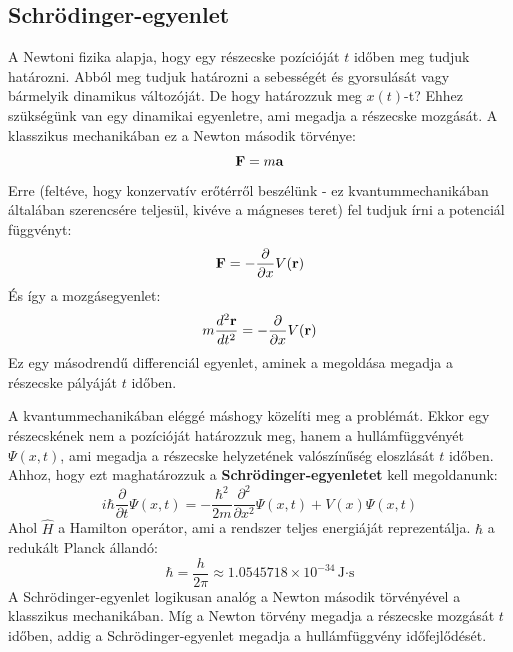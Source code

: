 \documentclass[../main.tex]{subfiles}
\begin{document}
\subsection{Schrödinger-egyenlet}
A Newtoni fizika alapja, hogy egy részecske pozícióját $t$ időben meg tudjuk határozni. Abból meg tudjuk határozni a sebességét és gyorsulását vagy bármelyik dinamikus változóját.
De hogy határozzuk meg $x(t)$-t? Ehhez szükségünk van egy dinamikai egyenletre, ami megadja a részecske mozgását. A klasszikus mechanikában ez a Newton második törvénye:
\begin{equation}
    \bold{F} = m \bold{a}
\end{equation}
Erre (feltéve, hogy konzervatív erőtérről beszélünk - ez kvantummechanikában általában szerencsére teljesül, kivéve a mágneses teret) fel tudjuk írni a potenciál függvényt:
\begin{equation}
    \bold{F} = - \frac{\partial}{\partial x} V(\bold{r})
\end{equation}
És így a mozgásegyenlet:
\begin{equation}
    m \frac{d^2 \bold{r}}{dt^2} = - \frac{\partial}{\partial x} V(\bold{r})
\end{equation}
Ez egy másodrendű differenciál egyenlet, aminek a megoldása megadja a részecske pályáját $t$ időben.

A kvantummechanikában eléggé máshogy közelíti meg a problémát. Ekkor egy részecskének nem a pozícióját határozzuk meg, hanem a hullámfüggvényét $\Psi(x,t)$, ami megadja a részecske helyzetének valószínűség eloszlását $t$ időben.
Ahhoz, hogy ezt maghatározzuk a \textbf{Schrödinger-egyenletet} kell megoldanunk:
\begin{equation}
    \boxed{i \hbar \frac{\partial}{\partial t} \Psi(x,t) = -\frac{\hbar^2}{2m} \frac{\partial^2}{\partial x^2} \Psi(x,t) + V(x) \Psi(x,t)}
\end{equation}
Ahol $\hat{H}$ a Hamilton operátor, ami a rendszer teljes energiáját reprezentálja. $\hbar$ a redukált Planck állandó:
\begin{equation}
    \hbar = \frac{h}{2 \pi} \approx 1.0545718 \times 10^{-34} \, \text{J·s}
\end{equation}
A Schrödinger-egyenlet logikusan analóg a Newton második törvényével a klasszikus mechanikában. Míg a Newton törvény megadja a részecske mozgását $t$ időben, addig a Schrödinger-egyenlet megadja a hullámfüggvény időfejlődését.
\end{document}
